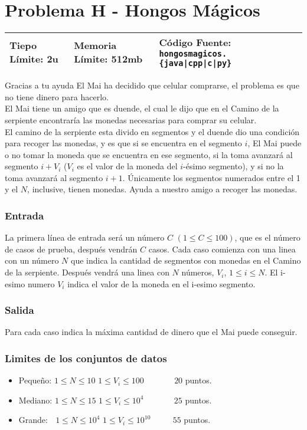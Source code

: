 \chapter*{Problema H - Hongos Mágicos}

\begin{center}
  \begin{tabular}{ | l | l | l | }
    \hline
    Tiepo Límite: 2u & Memoria Límite: 512mb & Código Fuente: \texttt{hongosmagicos.\{java|cpp|c|py\}} \\
    \hline
  \end{tabular}
\end{center}


Gracias a tu ayuda El Mai ha decidido que celular comprarse, el problema es que no tiene dinero para hacerlo. \\
El Mai tiene un amigo que es duende, el cual le dijo que en el Camino de la serpiente encontraría las monedas necesarias para comprar su celular. \\
El camino de la serpiente esta divido en segmentos y el duende dio una condición para recoger las monedas, y es que si se encuentra en el segmento $i$, El Mai puede o no tomar la moneda que se encuentra en ese segmento, si la toma avanzará al segmento $i + V_i$ ($V_i$ es el valor de la moneda del $i$-ésimo segmento), y si no la toma avanzará al segmento $i+1$. Únicamente los segmentos numerados entre el 1 y el $N$, inclusive, tienen monedas. Ayuda a nuestro amigo a recoger las monedas.

\subsection*{Entrada}

La primera línea de entrada será un número $C$ $(1 \leq  C\leq 100)$, que es el número de casos de prueba, después vendrán $C$ casos. Cada caso comienza con una linea con un número $N$ que indica la cantidad de segmentos con monedas en el Camino de la serpiente. Después vendrá una linea con $N$ números, $V_i$, $1\leq i \leq N$. El i-esimo numero $V_i$ indica el valor de la moneda en el i-esimo segmento.

\subsection*{Salida}
Para cada caso indica la máxima cantidad de dinero que el Mai puede conseguir.

\subsection*{Limites de los conjuntos de datos}
\begin{itemize}
    \item Pequeño: $ 1\leq N \leq 10 $ $ 1\leq V_i \leq 100 $ $\quad \quad \quad$ $20$ puntos.
    \item Mediano: $ 1\leq N\leq 15 $ $ 1\leq V_i \leq 10^4 $ $\quad \quad \quad$ $25$ puntos.
    \item Grande: $ \,\;\, 1\leq N\leq 10^4 $ $ 1\leq V_i \leq 10^{10} $ $\quad \quad$ $55$ puntos.
\end{itemize}

